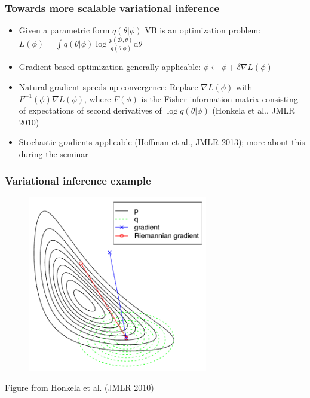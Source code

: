 \documentclass{beamer}
\newcommand{\dataset}{\mathcal{D}}
\newcommand{\parameters}{\theta}
\newcommand{\vparameters}{\phi}
\newcommand{\diff}{\mathrm{d}}
\begin{document}
\begin{frame}
  \frametitle{Towards more scalable variational inference}

  \begin{itemize}
  \item Given a parametric form $q(\parameters|\vparameters)$ VB is an optimization problem:
  $L(\vparameters) = \int q(\parameters|\vparameters) \log \frac{p(\dataset,\parameters)}{q(\parameters|\vparameters)} \diff \parameters$
  \item Gradient-based optimization generally applicable: $\vparameters \leftarrow \vparameters + \delta
    \nabla L(\vparameters)$
  \item Natural gradient speeds up convergence: Replace $\nabla L(\vparameters)$ with $F^{-1}(\vparameters)
\nabla L(\vparameters)$, where $F(\vparameters)$ is the Fisher information matrix
  consisting of expectations of second derivatives of $\log q(\parameters | \vparameters)$
 (Honkela et al., JMLR 2010)
  \item Stochastic gradients applicable (Hoffman et al., JMLR 2013); more about this during the seminar
  \end{itemize}
\end{frame}

\begin{frame}
  \frametitle{Variational inference example}

  \begin{figure}
  \begin{center}
  \includegraphics[width=0.7\textwidth]{VBnatgrad.pdf}
  \end{center}
  \end{figure}
  \vfill \hfill {\tiny Figure from Honkela et al. (JMLR 2010)}
\end{frame}
\end{document}
